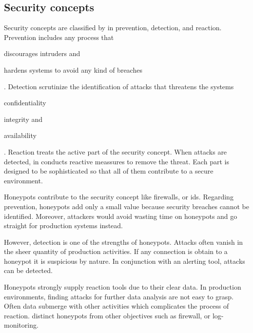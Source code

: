 \subsection{Security concepts}
\label{subsec:honeypot-security-concept}

Security concepts are classified by \citet{Schneier2004} in prevention, detection, and reaction.
Prevention includes any process that
\begin{enumerate*}[label=(\roman*)]
    \item discourages intruders and
    \item hardens systems to avoid any kind of breaches
\end{enumerate*}.
Detection scrutinize the identification of attacks that threatens the systems
\begin{enumerate*}[label=(\roman*)]
    \item confidentiality
    \item integrity and
    \item availability
\end{enumerate*}.
Reaction treats the active part of the security concept.
When attacks are detected, in conducts reactive meassures to remove the threat.
Each part is designed to be sophisticated so that all of them contribute to a secure environment. \cite{NawrockiWSKS2016}

Honeypots contribute to the security concept like firewalls, or \ac{ids}. Regarding prevention, honeypots add only a small value because security breaches cannot be identified.
Moreover, attackers would avoid wasting time on honeypots and go straight for production systems instead.

However, detection is one of the strengths of honeypots.
Attacks often vanish in the sheer quantity of production activities.
If any connection is obtain to a honeypot it is suspicious by nature.
In conjunction with an alerting tool, attacks can be detected.

Honeypots strongly supply reaction tools due to their clear data.
In production environments, finding attacks for further data analysis are not easy to grasp.
Often data submerge with other activities which complicates the process of reaction. \cite{NawrockiWSKS2016}
\citet{NawrockiWSKS2016} distinct honeypots from other objectives such as firewall, or log-monitoring.

